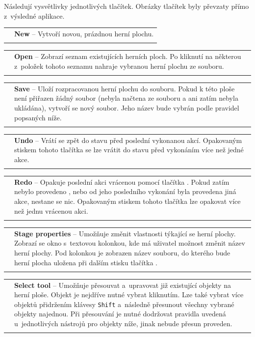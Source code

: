 \newcommand{\describeeditorbutton}[3]{
\noindent\begin{tabularx}{\textwidth}{lX}
    \scalebox{2}{\texttt{[image: \#2]}} & \textbf{#1} -- #3 \\
    \\
\end{tabularx}
}

Následují vysvětlivky jednotlivých tlačítek. Obrázky tlačítek byly převzaty přímo z~výsledné aplikace.\\

\describeeditorbutton{New}{doc/obrazky-figures/new.png}{Vytvoří novou, prázdnou herní plochu.}

\describeeditorbutton{Open}{doc/obrazky-figures/open.png}{Zobrazí seznam existujících herních ploch. Po kliknutí na některou z~položek tohoto seznamu nahraje vybranou herní plochu ze souboru.}

\describeeditorbutton{Save}{doc/obrazky-figures/save.png}{Uloží rozpracovanou herní plochu do souboru. Pokud k této ploše není přiřazen žádný soubor (nebyla načtena ze souboru a ani zatím nebyla ukládána), vytvoří se nový soubor. Jeho název bude vybrán podle pravidel popsaných níže.}

\describeeditorbutton{Undo}{doc/obrazky-figures/undo.png}{Vrátí se zpět do stavu před poslední vykonanou akcí. Opakovaným stiskem tohoto tlačítka se lze vrátit do stavu před vykonáním více než jedné akce.}

\describeeditorbutton{Redo}{doc/obrazky-figures/redo.png}{Opakuje poslední akci vrácenou pomocí tlačítka \uv{Undo}. Pokud zatím nebylo provedeno \uv{undo}, nebo od jeho posledního vykonání byla provedena jiná akce, nestane se nic. Opakovaným stiskem tohoto tlačítka lze opakovat více než jednu vrácenou akci.}

\describeeditorbutton{Stage properties}{doc/obrazky-figures/cogwheel.png}{Umožňuje změnit vlastnosti týkající se herní plochy. Zobrazí se okno s~textovou kolonkou, kde má uživatel možnost změnit název herní plochy. Pod kolonkou je zobrazen název souboru, do kterého bude herní plocha uložena při dalším stisku tlačítka \uv{Save}.}

\describeeditorbutton{Select tool}{doc/obrazky-figures/select-tool.png}{Umožňuje přesouvat a~upravovat již existující objekty na herní ploše. Objekt je nejdříve nutné vybrat kliknutím. Lze také vybrat více objektů přidržením klávesy \texttt{Shift} a~následně přesunout všechny vybrané objekty najednou. Při přesouvání je nutné dodržovat pravidla uvedená u~jednotlivých nástrojů pro objekty níže, jinak nebude přesun proveden.}

